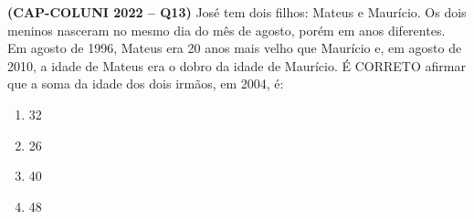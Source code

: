\textbf{(CAP-COLUNI 2022 -- Q13)} José tem dois filhos: Mateus e Maurício. Os dois meninos nasceram no mesmo dia do mês de agosto, porém em anos diferentes. Em agosto de 1996, Mateus era 20 anos mais velho que Maurício e, em agosto de 2010, a idade de Mateus era o dobro da idade de Maurício. É CORRETO afirmar que a soma da idade dos dois irmãos, em 2004, é:

\begin{enumerate}
	\item 32
	\item 26
	\item 40
	\item 48
\end{enumerate}

